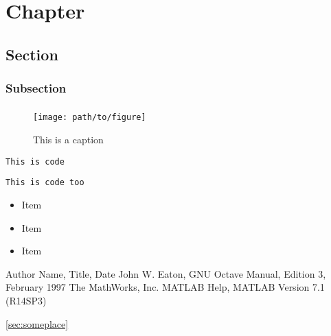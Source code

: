 
\chapter{Chapter}
\section{Section}
\subsection{Subsection}

\paragraph{}
\paragraph{}
\paragraph{} %


\begin{figure}[H]
\centering
\texttt{[image: path/to/figure]}
\caption{This is a caption}
\end{figure}


\lstinline{This is code}


\begin{lstlisting}
This is code too
\end{lstlisting}


\begin{itemize}
    \item Item
    \item Item
    \item Item %
\end{itemize}

\begin{thebibliography}{99}
 Author Name, Title, Date
 John W. Eaton, GNU Octave Manual, Edition 3, February 1997
 The MathWorks, Inc.
MATLAB Help, MATLAB Version 7.1 (R14SP3)
\end{thebibliography}

\cite{1}


\label{sec:someplace}
\ref{sec:someplace}